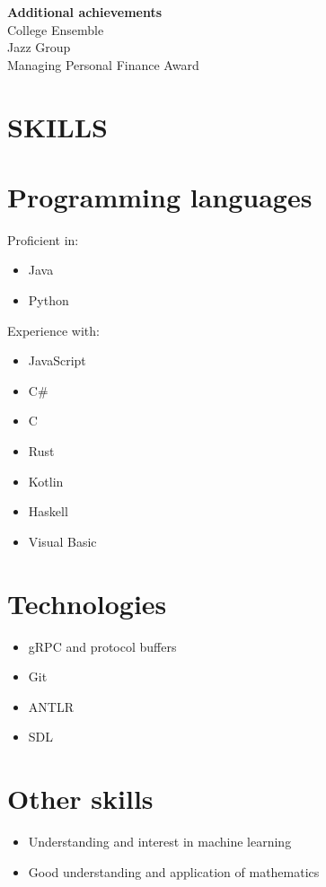 \documentclass[margin]{res}
\begin{document}
\begin{resume}
{\bf Additional achievements} \\
College Ensemble \\
Jazz Group \\
Managing Personal Finance Award

\section{SKILLS}

\normalsize{\section{Programming languages}}
Proficient in:
\begin{itemize}
\item Java
\item Python
\end{itemize}

\begin{samepage}
Experience with:
\begin{itemize}
\item JavaScript
\item C\#
\item C
\item Rust
\item Kotlin
\item Haskell
\item Visual Basic
\end{itemize}
\end{samepage}

\normalsize{\section{Technologies}}
\begin{itemize}
\item gRPC and protocol buffers
\item Git
\item ANTLR
\item SDL
\end{itemize}

\normalsize{\section{Other skills}}
\begin{itemize}
\item Understanding and interest in machine learning
\item Good understanding and application of mathematics
\end{itemize}


\end{resume}
\end{document}
